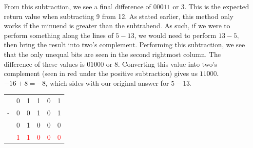\documentclass[oneside]{book}
\begin{document}
\tab
From this subtraction, we see a final difference of $00011$ or $3$. This is the expected return value when subtracting 9 from 12. As stated earlier, this method only works if the minuend is greater than the subtrahend. As such, if we were to perform something along the lines of $5-13$, we would need to perform $13-5$, then bring the result into two's complement. Performing this subtraction, we see that the only unequal bits are seen in the second rightmost column. The difference of these values is $01000$ or 8. Converting this value into two's complement (seen in red under the positive subtraction) gives us $11000$. $-16+8=-8$, which sides with our original answer for $5-13$. 

\begin{center}
\begin{tabular}{c c c c c c}
  & 0 & 1 & 1 & 0 & 1 \\
- & 0 & 0 & 1 & 0 & 1 \\
\hline
  & 0 & 1 & 0 & 0 & 0 \\
  & \textcolor{red}{1} & \textcolor{red}{1} & \textcolor{red}{0} & \textcolor{red}{0} & \textcolor{red}{0}
\end{tabular}
\end{center}
\end{document}
